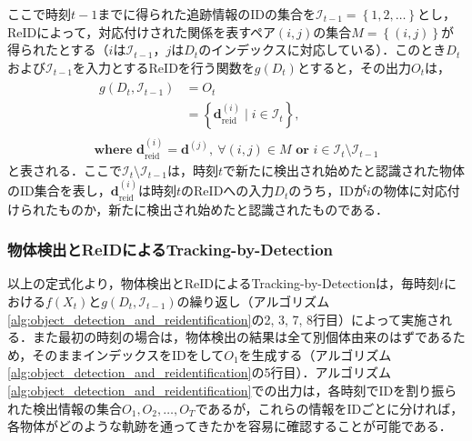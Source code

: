         ここで時刻$t-1$までに得られた追跡情報のIDの集合を$\mathcal{I}_{t-1} = \left\{1, 2, \dots\right\}$とし，ReIDによって，対応付けされた関係を表すペア$(i, j)$の集合$M = \left\{(i, j)\right\}$が得られたとする（$i$は$\mathcal{I}_{t-1}$，$j$は$D_t$のインデックスに対応している）．このとき$D_t$および$\mathcal{I}_{t-1}$を入力とするReIDを行う関数を$g(D_t)$とすると，その出力$O_t$は，
        \begin{equation}
            \label{eq:output_of_reid}
            \begin{gathered}
                \begin{aligned}
                    g(D_t, \mathcal{I}_{t-1}) &= O_t
                    \\ &= \left\{\bm{d}_{\text{reid}}^{(i)} \mid i \in \mathcal{I}_t\right\},
                \end{aligned}
                \\ \textbf{where } \bm{d}_{\text{reid}}^{(i)} = \bm{d}^{(j)}, ~ \forall (i, j) \in M \textbf{ or } i \in \mathcal{I}_t \setminus \mathcal{I}_{t-1}
            \end{gathered}
        \end{equation}
        と表される．ここで$\mathcal{I}_t \setminus \mathcal{I}_{t-1}$は，時刻$t$で新たに検出され始めたと認識された物体のID集合を表し，$\bm{d}_{\text{reid}}^{(i)}$は時刻$t$のReIDへの入力$D_t$のうち，IDが$i$の物体に対応付けられたものか，新たに検出され始めたと認識されたものである．

        \subsubsection{物体検出とReIDによるTracking-by-Detection}
        以上の定式化より，物体検出とReIDによるTracking-by-Detectionは，毎時刻$t$における$f(X_t)$と$g(D_t, \mathcal{I}_{t-1})$の繰り返し（アルゴリズム\ref{alg:object_detection_and_reidentification}の2, 3, 7, 8行目）によって実施される．また最初の時刻の場合は，物体検出の結果は全て別個体由来のはずであるため，そのままインデックスをIDをして$O_1$を生成する（アルゴリズム\ref{alg:object_detection_and_reidentification}の5行目）．アルゴリズム\ref{alg:object_detection_and_reidentification}での出力は，各時刻でIDを割り振られた検出情報の集合$O_1, O_2, \dots, O_T$であるが，これらの情報をIDごとに分ければ，各物体がどのような軌跡を通ってきたかを容易に確認することが可能である．

